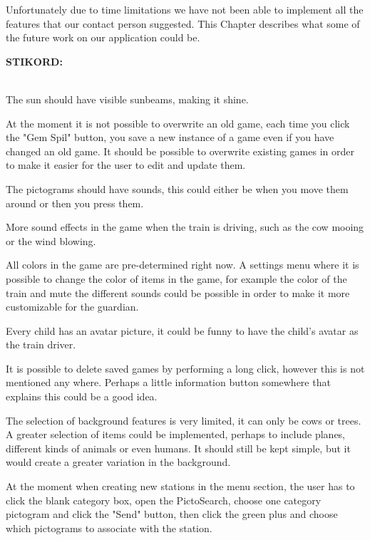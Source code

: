 Unfortunately due to time limitations we have not been able to implement all the features that our contact person suggested. This Chapter describes what some of the future work on our application could be.

\textbf{STIKORD:}\\\\
\begin{description}
\item The sun should have visible sunbeams, making it shine. 
\item At the moment it is not possible to overwrite an old game, each time you click the "Gem Spil" button, you save a new instance of a game even if you have changed an old game. It should be possible to overwrite existing games in order to make it easier for the user to edit and update them.
\item The pictograms should have sounds, this could either be when you move them around or then you press them. 
\item More sound effects in the game when the train is driving, such as the cow mooing or the wind blowing. 
\item All colors in the game are pre-determined right now. A settings menu where it is possible to change the color of items in the game, for example the color of the train and mute the different sounds could be possible in order to make it more customizable for the guardian.  
\item Every child has an avatar picture, it could be funny to have the child's avatar as the train driver. 
\item It is possible to delete saved games by performing a long click, however this is not mentioned any where. Perhaps a little information button somewhere that explains this could be a good idea. 
\item The selection of background features is very limited, it can only be cows or trees. A greater selection of items could be implemented, perhaps to include planes, different kinds of animals or even humans. It should still be kept simple, but it would create a greater variation in the background. 
\item At the moment when creating new stations in the menu section, the user has to click the blank category box, open the PictoSearch, choose one category pictogram and click the "Send" button, then click the green plus and choose which pictograms to associate with the station.


\end{description}

